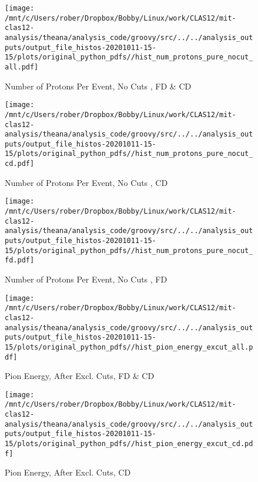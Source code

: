 \documentclass{article}
\begin{document}
\begin{landscape}
    \begin{figure}[h]
        \centering

        \texttt{[image: /mnt/c/Users/rober/Dropbox/Bobby/Linux/work/CLAS12/mit-clas12-analysis/theana/analysis\_code/groovy/src/../../analysis\_outputs/output\_file\_histos-20201011-15-15/plots/original\_python\_pdfs//hist\_num\_protons\_pure\_nocut\_all.pdf]}
        \captionsetup{textformat=empty,labelformat=blank}
        \caption{Number of Protons Per Event, No Cuts , FD \& CD}
    \end{figure}
    \clearpage
    
    \begin{figure}[h]
        \centering

        \texttt{[image: /mnt/c/Users/rober/Dropbox/Bobby/Linux/work/CLAS12/mit-clas12-analysis/theana/analysis\_code/groovy/src/../../analysis\_outputs/output\_file\_histos-20201011-15-15/plots/original\_python\_pdfs//hist\_num\_protons\_pure\_nocut\_cd.pdf]}
        \captionsetup{textformat=empty,labelformat=blank}
        \caption{Number of Protons Per Event, No Cuts , CD}
    \end{figure}
    \clearpage
    
    \begin{figure}[h]
        \centering

        \texttt{[image: /mnt/c/Users/rober/Dropbox/Bobby/Linux/work/CLAS12/mit-clas12-analysis/theana/analysis\_code/groovy/src/../../analysis\_outputs/output\_file\_histos-20201011-15-15/plots/original\_python\_pdfs//hist\_num\_protons\_pure\_nocut\_fd.pdf]}
        \captionsetup{textformat=empty,labelformat=blank}
        \caption{Number of Protons Per Event, No Cuts , FD}
    \end{figure}
    \clearpage
    
    \begin{figure}[h]
        \centering

        \texttt{[image: /mnt/c/Users/rober/Dropbox/Bobby/Linux/work/CLAS12/mit-clas12-analysis/theana/analysis\_code/groovy/src/../../analysis\_outputs/output\_file\_histos-20201011-15-15/plots/original\_python\_pdfs//hist\_pion\_energy\_excut\_all.pdf]}
        \captionsetup{textformat=empty,labelformat=blank}
        \caption{Pion Energy, After Excl. Cuts, FD \& CD}
    \end{figure}
    \clearpage
    
    \begin{figure}[h]
        \centering

        \texttt{[image: /mnt/c/Users/rober/Dropbox/Bobby/Linux/work/CLAS12/mit-clas12-analysis/theana/analysis\_code/groovy/src/../../analysis\_outputs/output\_file\_histos-20201011-15-15/plots/original\_python\_pdfs//hist\_pion\_energy\_excut\_cd.pdf]}
        \captionsetup{textformat=empty,labelformat=blank}
        \caption{Pion Energy, After Excl. Cuts, CD}
    \end{figure}
    \clearpage
    

\end{landscape}
\end{document}
